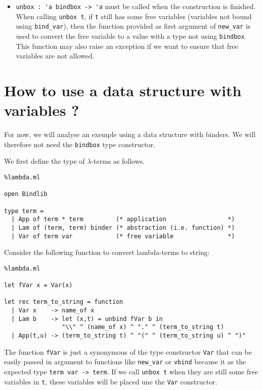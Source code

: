 \documentclass[11pt]{article}
\begin{document}
\begin{itemize}
\item \verb#unbox : 'a bindbox -> 'a# must be called when the
  construction is finished. When calling \verb#unbox t#, if
  \verb#t# still has some free variables (variables not bound
  using \verb#bind_var#), then the function provided as
  first argument of \verb#new_var# is used to convert the free
  variable to a value with a type not using \verb#bindbox#. This
  function may also raise an exception if we want to ensure that
  free variables are not allowed.
\end{itemize}

\section{How to use a data structure with variables ?}

For now, we will analyse an exemple using a data structure with
binders. We will therefore not need the \verb#bindbox# type constructor.

We first define the type of $\lambda$-terms as follows.
\begin{lstlisting}%lambda.ml

open Bindlib

type term =
  | App of term * term         (* application                 *)
  | Lam of (term, term) binder (* abstraction (i.e. function) *)
  | Var of term var            (* free variable               *)
\end{lstlisting}

Consider the following function to convert lambda-terms to string:

\begin{lstlisting}%lambda.ml

let fVar x = Var(x)

let rec term_to_string = function
  | Var x    -> name_of x
  | Lam b    -> let (x,t) = unbind fVar b in
                "\\" ^ (name_of x) ^ "." ^ (term_to_string t)
  | App(t,u) -> (term_to_string t) ^ "(" ^ (term_to_string u) ^ ")"
\end{lstlisting}

The function \verb!fVar! is just a synonymous of the type constructor
\verb!Var! that can be easily passed in argument to functions like
\verb#new_var# or \verb#vbind# because it as the expected type
\verb#term var -> term#. If we call \verb#unbox t# when they are still
some free variables in \verb#t#, these variables will be placed une
the \verb#Var# constructor.
\end{document}
